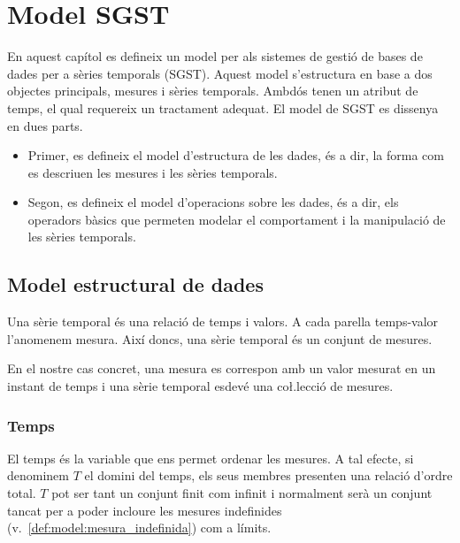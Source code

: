 
\chapter{Model SGST}
\label{cap:model:sgst}


En aquest capítol es defineix un model per als sistemes de gestió de
bases de dades per a sèries temporals (SGST). Aquest model
s'estructura en base a dos objectes principals, mesures i sèries temporals.
Ambdós tenen un atribut de temps, el qual requereix un tractament
adequat. El model de SGST es dissenya en dues parts.

\begin{itemize}
\item Primer, es defineix el model d'estructura de les dades, és a
  dir, la forma com es descriuen les mesures i les sèries temporals.  
\item Segon, es defineix el model d'operacions sobre les dades, és a
  dir, els operadors bàsics que permeten modelar el comportament i la
  manipulació de les sèries temporals.
\end{itemize}





\section{Model estructural de dades}

Una sèrie temporal és una relació de temps i valors. A cada parella
temps-valor l'anomenem mesura. Així doncs, una sèrie temporal és un
conjunt de mesures. 


En el nostre cas concret, una mesura es correspon amb un valor mesurat
en un instant de temps i una sèrie temporal esdevé una co\l.lecció de
mesures.





\subsection{Temps}
\label{sec:sgst:temps}

El temps és la variable que ens permet ordenar les mesures.  A tal
efecte, si denominem $T$ el domini del temps, els seus membres
presenten una relació d'ordre total. $T$ pot ser tant un conjunt finit
com infinit i normalment serà un conjunt tancat %
per a poder incloure les mesures indefinides (v.\
\autoref{def:model:mesura_indefinida}) com a límits.

